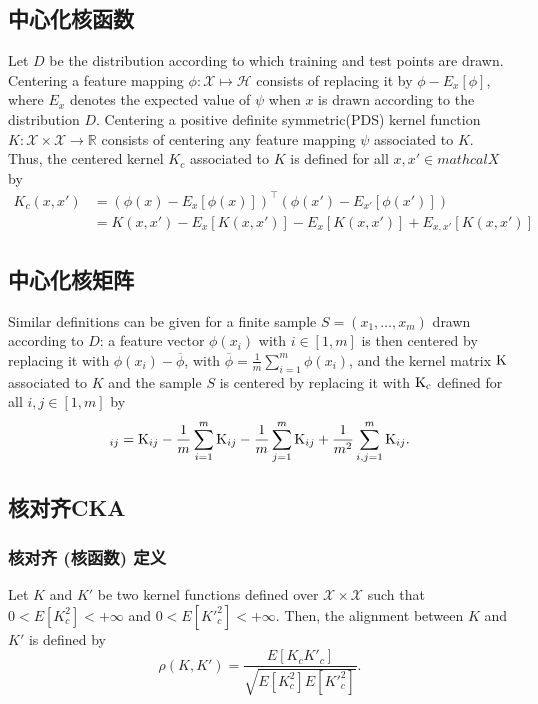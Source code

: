 \documentclass{ctexart}
\begin{document}
    \subsection{中心化核函数}
    Let $D$ be the distribution according to which training and test points are drawn. 
    Centering a feature mapping $\phi: \mathcal{X}\mapsto\mathcal{H}$ consists of replacing it by $\phi-E_x[\phi]$,
    where $E_x$ denotes the expected value of $\psi$ when $x$ is drawn according to the distribution $D$.
    Centering a positive definite symmetric(PDS) kernel function $K: \mathcal{X}\times\mathcal{X}\rightarrow\mathbb{R}$ consists of centering any feature mapping $\psi$ associated to $K$.
    Thus, the centered kernel $K_c$ associated to $K$ is defined for all $x, x'\in{mathcal{X}}$ by
    \begin{equation}
        \begin{aligned}
            K_c(x, x') &= \left(\phi(x)-E_x[\phi(x)]\right)^{\top} \left(\phi(x')-E_{x'}[\phi(x')]\right) \\
                       &= K(x, x')-E_x[K(x, x')]-E_x[K(x, x')]+E_{x, x'}[K(x, x')]
        \end{aligned}
    \end{equation}

    \subsection{中心化核矩阵}
    Similar definitions can be given for a finite sample $S=(x_1, \dots, x_m)$ drawn according to $D$: 
    a feature vector $\phi(x_i)$ with $i\in[1, m]$ is then centered by replacing it with $\phi(x_i)-\overline{\phi}$, 
    with $\overline{\phi}=\frac{1}{m}\sum_{i=1}^m\phi(x_i)$, 
    and the kernel matrix ${\rm K}$ associated to $K$ and the sample $S$ is centered by replacing it with ${\rm K_c}$ defined for all $i, j\in[1, m]$ by
    \begin{equation}
        [{\rm K_c}]_{ij} = {\rm K}_{ij} - \frac{1}{m}\sum_{i=1}^{m}{\rm K}_{ij}-\frac{1}{m}\sum_{j=1}^{m}{\rm K}_{ij}+\frac{1}{m^2}\sum_{i,j=1}^{m}{\rm K}_{ij}.
    \end{equation} 

    \subsection{核对齐CKA}
    \subsubsection{核对齐 (核函数) 定义}
    Let $K$ and $K'$ be two kernel functions defined over $\mathcal{X}\times\mathcal{X}$ such that $0<E[K_c^2]<+\infty$ and $0<E[{K'}_c^2]<+\infty$.
    Then, the alignment between $K$ and $K'$ is defined by 
    \begin{equation}
        \rho (K, {K'}) = \frac{E[K_{c}{K'}_{c}]}{\sqrt{E[K_c^2]E[{K'}_c^2]}}. 
    \end{equation}
\end{document}
